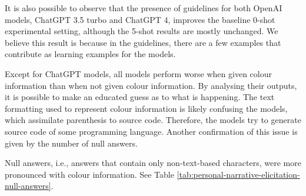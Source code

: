 It is also possible to observe that the presence of guidelines for both OpenAI models, ChatGPT 3.5 turbo and ChatGPT 4, improves the baseline 0-shot experimental setting, although the 5-shot results are mostly unchanged. We believe this result is because in the guidelines, there are a few examples that contribute as learning examples for the models.  

Except for ChatGPT models, all models perform worse when given colour information than when not given colour information. By analysing their outputs, it is possible to make an educated guess as to what is happening. The text formatting used to represent colour information is likely confusing the models, which assimilate parenthesis to source code. Therefore, the models try to generate source code of some programming language. Another confirmation of this issue is given by the number of null answers. 

Null answers, i.e., answers that contain only non-text-based characters, were more pronounced with colour information. See Table \ref{tab:personal-narrative-elicitation-null-answers}.


